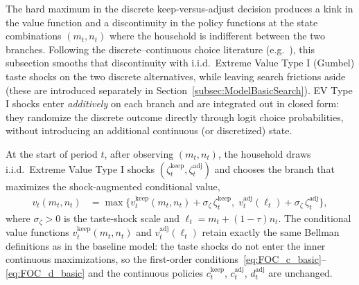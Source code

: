 The hard maximum in the discrete keep-versus-adjust decision produces a kink in the value function and a discontinuity in the policy functions at the state combinations $(m_t,n_t)$ where the household is indifferent between the two branches. Following the discrete--continuous choice literature (e.g.\ \cite{Iskhakov2017-jb}), this subsection smooths that discontinuity with i.i.d.\ Extreme Value Type I (Gumbel) taste shocks on the two discrete alternatives, while leaving search frictions aside (these are introduced separately in Section~\ref{subsec:ModelBasicSearch}). EV Type I shocks enter \emph{additively} on each branch and are integrated out in closed form: they randomize the discrete outcome directly through logit choice probabilities, without introducing an additional continuous (or discretized) state.

At the start of period $t$, after observing $(m_t,n_t)$, the household draws i.i.d.\ Extreme Value Type I shocks $(\zeta_t^{\text{keep}},\zeta_t^{\text{adj}})$ and chooses the branch that maximizes the shock-augmented conditional value,
\begin{align}
	v_t(m_t,n_t)
	&= \max\Big\{
		v_t^{\text{keep}}(m_t,n_t) + \sigma_\zeta\,\zeta_t^{\text{keep}},\;
		v_t^{\text{adj}}(\ell_t) + \sigma_\zeta\,\zeta_t^{\text{adj}}
	\Big\}, \label{eq:taste_discrete_EV}
\end{align}
where $\sigma_\zeta > 0$ is the taste-shock scale and $\ell_t = m_t+(1-\tau)n_t$. The conditional value functions $v_t^{\text{keep}}(m_t,n_t)$ and $v_t^{\text{adj}}(\ell_t)$ retain exactly the same Bellman definitions as in the baseline model: the taste shocks do not enter the inner continuous maximizations, so the first-order conditions~\eqref{eq:FOC_c_basic}--\eqref{eq:FOC_d_basic} and the continuous policies $c_t^{\text{keep}}$, $c_t^{\text{adj}}$, $d_t^{\text{adj}}$ are unchanged.

